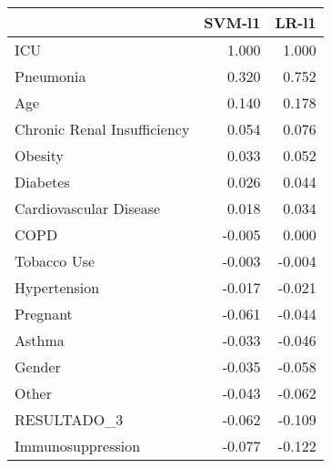 \begin{tabular}{lrr}
\toprule
{} &  SVM-l1 &  LR-l1 \\
\midrule
ICU                         &   1.000 &  1.000 \\
Pneumonia                   &   0.320 &  0.752 \\
Age                         &   0.140 &  0.178 \\
Chronic Renal Insufficiency &   0.054 &  0.076 \\
Obesity                     &   0.033 &  0.052 \\
Diabetes                    &   0.026 &  0.044 \\
Cardiovascular Disease      &   0.018 &  0.034 \\
COPD                        &  -0.005 &  0.000 \\
Tobacco Use                 &  -0.003 & -0.004 \\
Hypertension                &  -0.017 & -0.021 \\
Pregnant                    &  -0.061 & -0.044 \\
Asthma                      &  -0.033 & -0.046 \\
Gender                      &  -0.035 & -0.058 \\
Other                       &  -0.043 & -0.062 \\
RESULTADO\_3                 &  -0.062 & -0.109 \\
Immunosuppression           &  -0.077 & -0.122 \\
\bottomrule
\end{tabular}
